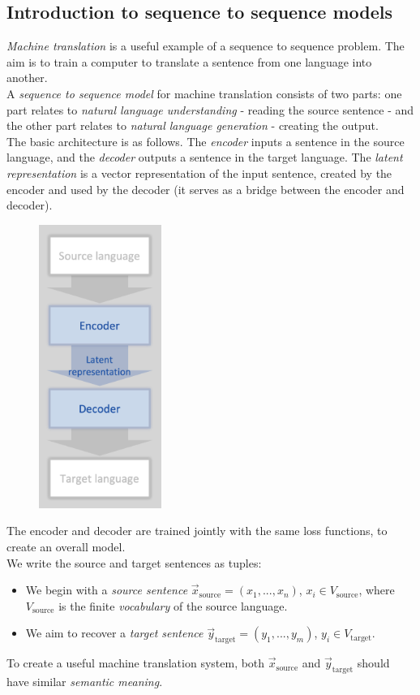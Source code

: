 \subsection{Introduction to sequence to sequence models}

\textit{Machine translation} is a useful example of a sequence to sequence problem. The aim is to train a computer to translate a sentence from one language into another.\\

A \textit{sequence to sequence model} for machine translation consists of two parts: one part relates to \textit{natural language understanding} - reading the source sentence - and the other part relates to \textit{natural language generation} - creating the output.\\

The basic architecture is as follows. The \textit{encoder} inputs a sentence in the source language, and the \textit{decoder} outputs a sentence in the target language. The \textit{latent representation} is a vector representation of the input sentence, created by the encoder and used by the decoder (it serves as a bridge between the encoder and decoder).

\begin{figure}[H]
\centering
\includegraphics[scale=0.4]{machinetranslation.png}
\end{figure}

The encoder and decoder are trained jointly with the same loss functions, to create an overall model.\\

We write the source and target sentences as tuples:
\begin{itemize}
\item We begin with a \textit{source sentence} $\vec{x}_{\text{source}} = (x_1,...,x_n)$, $x_i \in V_{\text{source}}$, where $V_{\text{source}}$ is the finite \textit{vocabulary} of the source language.
\item We aim to recover a \textit{target sentence} $\vec{y}_{\text{target}} = (y_1, ..., y_m)$, $y_i \in V_{\text{target}}$. 
\end{itemize}
To create a useful machine translation system, both $\vec{x}_{\text{source}}$ and $\vec{y}_{\text{target}}$ should have similar \textit{semantic meaning}.\\


